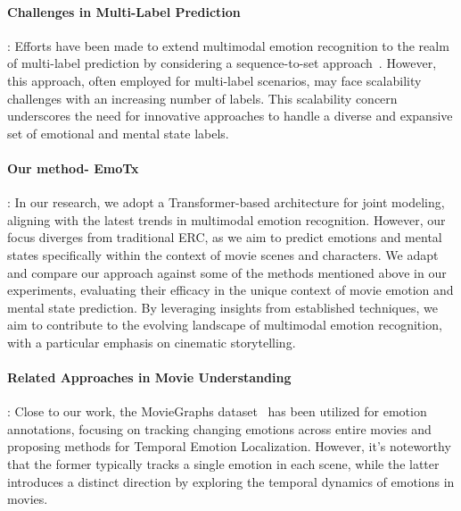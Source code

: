 \paragraph{Challenges in Multi-Label Prediction}:
Efforts have been made to extend multimodal emotion recognition to the realm of multi-label prediction by considering a sequence-to-set approach~\cite{zhang2020multilabelEmotionDet}. However, this approach, often employed for multi-label scenarios, may face scalability challenges with an increasing number of labels. This scalability concern underscores the need for innovative approaches to handle a diverse and expansive set of emotional and mental state labels.

\paragraph{Our method- EmoTx~\cite{dhruv2023emotx}}:
In our research, we adopt a Transformer-based architecture for joint modeling, aligning with the latest trends in multimodal emotion recognition. However, our focus diverges from traditional ERC, as we aim to predict emotions and mental states specifically within the context of movie scenes and characters.
We adapt and compare our approach against some of the methods mentioned above in our experiments, evaluating their efficacy in the unique context of movie emotion and mental state prediction. By leveraging insights from established techniques, we aim to contribute to the evolving landscape of multimodal emotion recognition, with a particular emphasis on cinematic storytelling.

\paragraph{Related Approaches in Movie Understanding}:
Close to our work, the MovieGraphs dataset~\cite{moviegraphs} has been utilized for emotion annotations, focusing on tracking changing emotions across entire movies and proposing methods for Temporal Emotion Localization. However, it's noteworthy that the former typically tracks a single emotion in each scene, while the latter introduces a distinct direction by exploring the temporal dynamics of emotions in movies.
